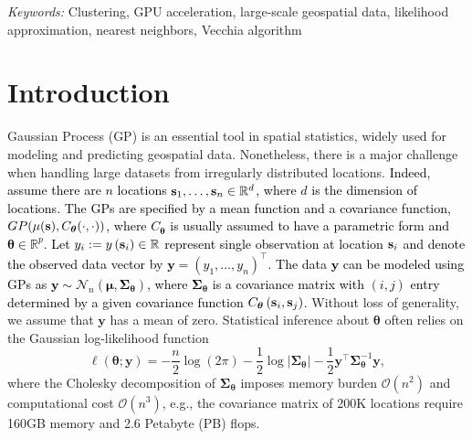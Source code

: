 \documentclass[12pt]{article}
\begin{document}
\noindent%
{\it Keywords:}  Clustering, GPU acceleration, large-scale geospatial data, likelihood approximation, nearest neighbors, Vecchia algorithm
\vfill

\newpage
{} %

    
\section{Introduction}

Gaussian Process (GP) is an essential tool in spatial statistics, widely used for modeling and predicting geospatial data. Nonetheless, there is a major challenge when handling large datasets from irregularly distributed locations.
\textcolor{black}{
Indeed, assume there are $n$ locations ${\bf s}_1, \ldots, {\bf s}_n \in \mathbb{R}^d$,  where $d$ is the dimension of locations. 
The GPs are specified by a mean function and a covariance function, $GP(\mu({\bf s}), C_{\bm \theta}(\cdot, \cdot))$, where $C_{\bm \theta}$ is usually assumed to have a parametric form and $\bm \theta \in \mathbb R^p$. 
Let $y_i:=y\left({\bf s}_i\right) \in \mathbb{R}$ represent single observation at location ${\bf s}_i$ and denote the observed data vector by $\boldsymbol{y} = \left(y_1, \ldots, y_n\right)^\top$. The data $\boldsymbol{y}$ can be modeled using GPs as $\boldsymbol{y} \sim \mathcal{N}_n\left(\bm \mu, \bm \Sigma_{\boldsymbol\theta}\right)$, where $\bm \Sigma_{\boldsymbol\theta}$ is a covariance matrix with $(i, j)$ entry determined by a given covariance function $C_{\boldsymbol\theta}\left(
{\bf s}_i, {\bf s}_j
\right)$.
}
Without loss of generality, we assume that $\boldsymbol{y}$ has a mean of zero. Statistical inference about $\boldsymbol{\theta}$ often relies on the Gaussian log-likelihood function
\begin{equation}
	\label{eq:likeli}
 \ell({\boldsymbol\theta};\boldsymbol{y})=-\frac{n}{2}\log(2\pi) - \frac{1}{2}\log |{{\boldsymbol \Sigma}_{\boldsymbol\theta}}|-\frac{1}{2}{\boldsymbol{y}}^\top {\boldsymbol \Sigma}_{\boldsymbol\theta}^{-1}{\boldsymbol{y}},
\end{equation}
where the Cholesky decomposition of $\boldsymbol\Sigma_{\boldsymbol\theta}$ imposes memory burden $\mathcal{O}(n^2)$ and computational cost $\mathcal{O}(n^3)$, e.g., the covariance matrix of 200K locations require 160GB memory and 2.6 Petabyte (PB)  flops.
\end{document}
